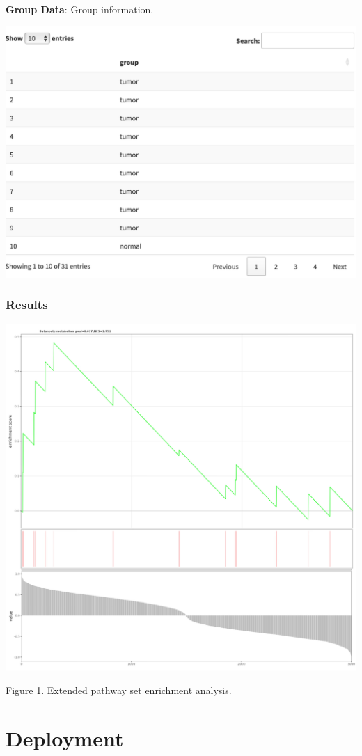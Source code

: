 \documentclass[
]{book}
\begin{document}
\textbf{Group Data}: Group information.

\begin{flushleft}\includegraphics[width=21.83in]{figure/GroupInfo} \end{flushleft}

\subsection{Results}\label{results-3}

\begin{center}\includegraphics[width=0.6\linewidth]{figure/2.eSEA} \end{center}

Figure 1. Extended pathway set enrichment analysis.

\chapter{Deployment}\label{deployment}
\end{document}
